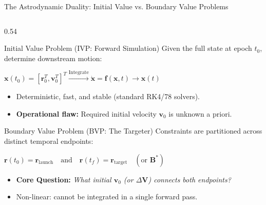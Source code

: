 \documentclass[aspectratio=169, 10pt]{beamer}
\begin{document}
\begin{frame}{The Astrodynamic Duality: Initial Value vs. Boundary Value Problems}
    \begin{columns}[t]
        \begin{column}{0.54\textwidth}
            \begin{block}{Initial Value Problem (IVP: Forward Simulation)}
                \scriptsize
                Given the full state at epoch $t_0$, determine downstream motion:
                \par\vspace{1pt}
                {\centering $\mathbf{x}(t_0) = [\mathbf{r}_0^T, \mathbf{v}_0^T]^T \xrightarrow{\text{Integrate}} \dot{\mathbf{x}} = \mathbf{f}(\mathbf{x}, t) \to \mathbf{x}(t)$\par}
                \vspace{2pt}
                \begin{itemize}\setlength{\itemsep}{1pt}\setlength{\topsep}{0pt}\setlength{\parsep}{0pt}
                    \item Deterministic, fast, and stable (standard RK4/78 solvers).
                    \item \textbf{Operational flaw:} Required initial velocity $\mathbf{v}_0$ is unknown a priori.
                \end{itemize}
            \end{block}

            \vspace{-0.08cm}

            \begin{block}{Boundary Value Problem (BVP: The Targeter)}
                \scriptsize
                Constraints are partitioned across distinct temporal endpoints:
                \par\vspace{1pt}
                {\centering $\mathbf{r}(t_0) = \mathbf{r}_{\text{launch}} \quad \text{and} \quad \mathbf{r}(t_f) = \mathbf{r}_{\text{target}} \quad (\text{or } \mathbf{B}^*)$\par}
                \vspace{2pt}
                \begin{itemize}\setlength{\itemsep}{1pt}\setlength{\topsep}{0pt}\setlength{\parsep}{0pt}
                    \item \textbf{Core Question:} \textit{What initial $\mathbf{v}_0$ (or $\Delta \mathbf{V}$) connects both endpoints?}
                    \item Non-linear: cannot be integrated in a single forward pass.
                \end{itemize}
            \end{block}
        \end{column}


\end{columns}
\end{frame}
\end{document}

